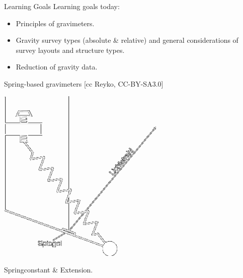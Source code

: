 \begin{frame}
    \begin{PointSix}{Learning Goals}
      \alert{Learning goals today:}
      \begin{itemize}
        \item Principles of gravimeters.
        \item Gravity survey types (absolute \& relative) and general considerations of survey layouts and structure types.
        \item Reduction of gravity data.
      \end{itemize}
    \end{PointSix}
\end{frame}
  
\begin{frame}
    \begin{PointSix}{Spring-based gravimeters}
        \tiny [cc Reyko, CC-BY-SA3.0]
      \begin{center}
        \includegraphics[width=0.6\textwidth]{Figures/Gravity/Exported/Reyko_CCBY-SA_LaCoste-Romberg_Reversed.png}
      
        \small Springconstant \& Extension.
      \end{center}
    \end{PointSix}
\end{frame}



